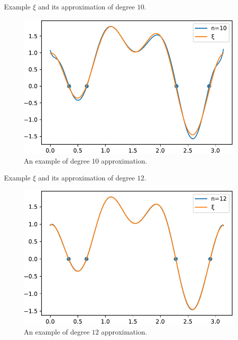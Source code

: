 \documentclass{beamer}
\begin{document}
\begin{frame}{Example}
	$\xi$ and its approximation of degree $10$.
	\begin{figure}
		\centering
		
		\includegraphics[scale=.6]{inexn10}
		\caption{An example of degree $10$ approximation.}
		
	\end{figure}
\end{frame}

\begin{frame}{Example}
	$\xi$ and its approximation of degree $12$.
	\begin{figure}
		\centering
		
		\includegraphics[scale=.6]{inexn12}
		\caption{An example of degree $12$ approximation.}
		
	\end{figure}
\end{frame}
\end{document}

